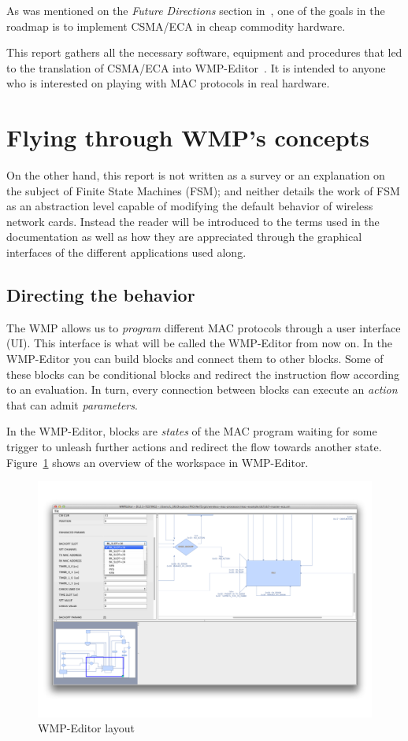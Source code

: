 As was mentioned on the \emph{Future Directions} section in~\cite{fairness-ECA}, one of the goals in the roadmap is to implement CSMA/ECA in cheap commodity hardware.

This report gathers all the necessary software, equipment and procedures that led to the translation of CSMA/ECA into WMP-Editor~\cite{FLAVIA}\cite{WMP-code}. It is intended to anyone who is interested on playing with MAC protocols in real hardware.

\section{Flying through WMP's concepts} 

On the other hand, this report is not written as a survey or an explanation on the subject of Finite State Machines (FSM); and neither details the work of FSM as an abstraction level capable of modifying the default behavior of wireless network cards. Instead the reader will be introduced to the terms used in the documentation as well as how they are appreciated through the graphical interfaces of the different applications used along.

\subsection{Directing the behavior}

The WMP allows us to \emph{program} different MAC protocols through a user interface (UI). This interface is what will be called the WMP-Editor from now on. In the WMP-Editor you can build blocks and connect them to other blocks. Some of these blocks can be conditional blocks and redirect the instruction flow according to an evaluation. In turn, every connection between blocks can execute an \emph{action} that can admit \emph{parameters}.

In the WMP-Editor, blocks are \emph{states} of the MAC program waiting for some trigger to unleash further actions and redirect the flow towards another state. Figure~\ref{fig:WMP-EditorLayout} shows an overview of the workspace in WMP-Editor.

\begin{figure}[htbp]
  \centering
  \includegraphics[width=0.95\linewidth]{figures/WMP-EditorLayout.pdf}
  \caption{WMP-Editor layout
  \label{fig:WMP-EditorLayout}}
\end{figure}

